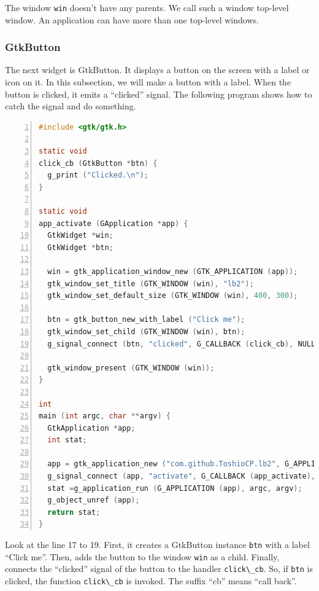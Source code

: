 The window \passthrough{\lstinline!win!} doesn't have any parents. We
call such a window top-level window. An application can have more than
one top-level windows.

\subsubsection{GtkButton}\label{gtkbutton}

The next widget is GtkButton. It displays a button on the screen with a
label or icon on it. In this subsection, we will make a button with a
label. When the button is clicked, it emits a ``clicked'' signal. The
following program shows how to catch the signal and do something.

\begin{lstlisting}[language=C, numbers=left]
#include <gtk/gtk.h>

static void
click_cb (GtkButton *btn) {
  g_print ("Clicked.\n");
}

static void
app_activate (GApplication *app) {
  GtkWidget *win;
  GtkWidget *btn;

  win = gtk_application_window_new (GTK_APPLICATION (app));
  gtk_window_set_title (GTK_WINDOW (win), "lb2");
  gtk_window_set_default_size (GTK_WINDOW (win), 400, 300);

  btn = gtk_button_new_with_label ("Click me");
  gtk_window_set_child (GTK_WINDOW (win), btn);
  g_signal_connect (btn, "clicked", G_CALLBACK (click_cb), NULL);

  gtk_window_present (GTK_WINDOW (win));
}

int
main (int argc, char **argv) {
  GtkApplication *app;
  int stat;

  app = gtk_application_new ("com.github.ToshioCP.lb2", G_APPLICATION_DEFAULT_FLAGS);
  g_signal_connect (app, "activate", G_CALLBACK (app_activate), NULL);
  stat =g_application_run (G_APPLICATION (app), argc, argv);
  g_object_unref (app);
  return stat;
}
\end{lstlisting}

Look at the line 17 to 19. First, it creates a GtkButton instance
\passthrough{\lstinline!btn!} with a label ``Click me''. Then, adds the
button to the window \passthrough{\lstinline!win!} as a child. Finally,
connects the ``clicked'' signal of the button to the handler
\passthrough{\lstinline!click\_cb!}. So, if
\passthrough{\lstinline!btn!} is clicked, the function
\passthrough{\lstinline!click\_cb!} is invoked. The suffix ``cb'' means
``call back''.

